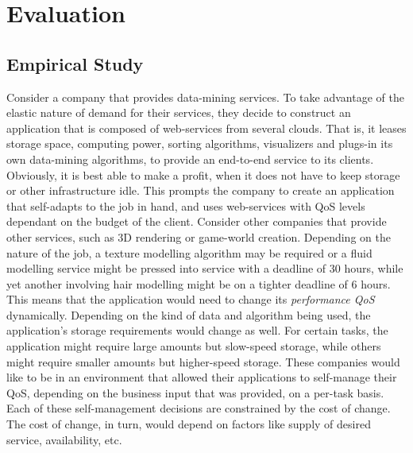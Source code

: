 \documentclass[10pt,journal,compsoc]{IEEEtran}
\begin{document}
\section{Evaluation}
\subsection{Empirical Study}
Consider a company that provides data-mining services. To take advantage of the elastic nature of demand for their services, they decide to construct an application that is composed of web-services from several clouds. That is, it leases storage space, computing power, sorting algorithms, visualizers and plugs-in its own data-mining algorithms, to provide an end-to-end service to its clients. Obviously, it is best able to make a profit, when it does not have to keep storage or other infrastructure idle. This prompts the company to create an application that self-adapts to the job in hand, and uses web-services with QoS levels dependant on the budget of the client. Consider other companies that provide other services, such as 3D rendering or game-world creation. Depending on the nature of the job, a texture modelling algorithm may be required or a fluid modelling service might be pressed into service with a deadline of 30 hours, while yet another involving hair modelling might be on a tighter deadline of 6 hours. This means that the application would need to change its \textit{performance QoS} dynamically. Depending on the kind of data and algorithm being used, the application's storage requirements would change as well. For certain tasks, the application might require large amounts but slow-speed storage, while others might require smaller amounts but higher-speed storage. These companies would like to be in an environment that allowed their applications to self-manage their QoS, depending on the business input that was provided, on a per-task basis. Each of these self-management decisions are constrained by the cost of change. The cost of change, in turn, would depend on factors like supply of desired service, availability, etc. 
\end{document}
